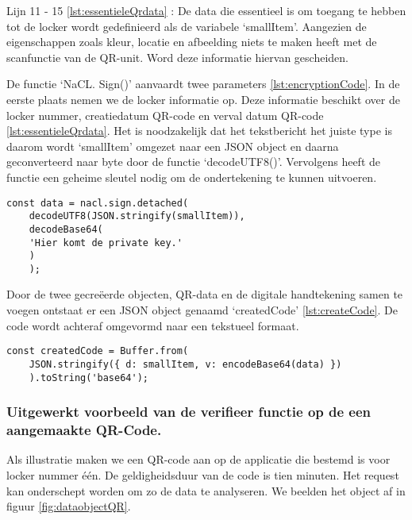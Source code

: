 Lijn 11 - 15 \ref{lst:essentieleQrdata} :  De data die essentieel is om toegang te hebben tot de locker wordt gedefinieerd als de variabele ‘smallItem’. Aangezien de eigenschappen zoals kleur, locatie en afbeelding niets te maken heeft met de scanfunctie van de QR-unit. Word deze informatie hiervan gescheiden.

De functie ‘NaCL. Sign()’ aanvaardt twee parameters \ref{lst:encryptionCode}. In de eerste plaats nemen we de locker informatie op. Deze informatie beschikt over de locker nummer, creatiedatum QR-code en verval datum QR-code \ref{lst:essentieleQrdata}. Het is noodzakelijk dat het tekstbericht het juiste type is daarom wordt ‘smallItem’ omgezet naar een JSON object en daarna geconverteerd naar byte door de functie ‘decodeUTF8()’. Vervolgens heeft de functie een geheime sleutel nodig om de ondertekening te kunnen uitvoeren.

\begin{lstlisting}[caption={Digitale ondertekening van QR-code data.}, label={lst:encryptionCode}]
    const data = nacl.sign.detached(
    decodeUTF8(JSON.stringify(smallItem)),
    decodeBase64(
    'Hier komt de private key.'
    )
    );
    \end{lstlisting}


Door de twee gecreëerde objecten, QR-data en de digitale handtekening samen te voegen ontstaat er een \ac{JSON} object genaamd ‘createdCode’ \ref{lst:createCode}. De code wordt achteraf omgevormd naar een tekstueel formaat.

\begin{lstlisting}[caption={Samenstellen van object, locker informatie en verificatie code.}, label={lst:createCode}]
    const createdCode = Buffer.from(
    JSON.stringify({ d: smallItem, v: encodeBase64(data) })
    ).toString('base64');
\end{lstlisting}

\newpage
\subsubsection{Uitgewerkt voorbeeld van de verifieer functie op de een aangemaakte QR-Code.}%
\label{sec:controleaangemaakteQRcode}

Als illustratie maken we een QR-code aan op de applicatie die bestemd is voor locker nummer één. De geldigheidsduur van de code is tien minuten. Het request kan onderschept worden om zo de data te analyseren. We beelden het object af in figuur \ref{fig:dataobjectQR}.


